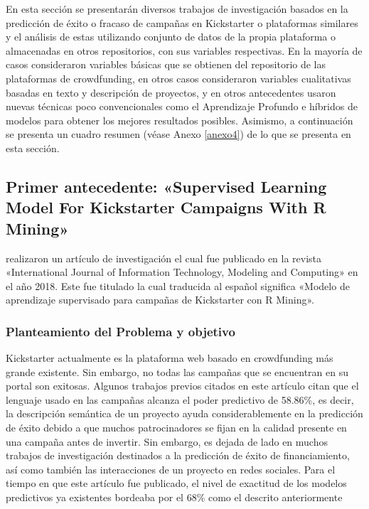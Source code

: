 En esta sección se presentarán diversos trabajos de investigación basados en la predicción de éxito o fracaso de campañas en Kickstarter o plataformas similares y el análisis de estas utilizando conjunto de datos de la propia plataforma o almacenadas en otros repositorios, con sus variables respectivas. En la mayoría de casos consideraron variables básicas que se obtienen del repositorio de las plataformas de crowdfunding, en otros casos consideraron variables cualitativas basadas en texto y descripción de proyectos, y en otros antecedentes usaron nuevas técnicas poco convencionales como el Aprendizaje Profundo e híbridos de modelos para obtener los mejores resultados posibles.
Asimismo, a continuación se presenta un cuadro resumen (véase Anexo \ref{anexo4}) de lo que se presenta en esta sección.

\subsection{Primer antecedente: «Supervised Learning Model For Kickstarter Campaigns With R Mining» \citep*{pr_kamath2018suplearn}}
\citeauthor{pr_kamath2018suplearn} realizaron un artículo de investigación el cual fue publicado en la revista «International Journal of Information Technology, Modeling and Computing» en el año 2018. Este fue titulado  la cual traducida al español significa «Modelo de aprendizaje supervisado para campañas de Kickstarter con R Mining».

\subsubsection{Planteamiento del Problema y objetivo}
Kickstarter actualmente es la plataforma web basado en crowdfunding más grande existente. Sin embargo, no todas las campañas que se encuentran en su portal son exitosas. Algunos trabajos previos citados en este artículo citan que el lenguaje usado en las campañas alcanza el poder predictivo de 58.86\%, es decir, la descripción semántica de un proyecto ayuda considerablemente en la predicción de éxito debido a que muchos patrocinadores se fijan en la calidad presente en una campaña antes de invertir.  Sin embargo, es dejada de lado en muchos trabajos de investigación destinados a la predicción de éxito de financiamiento, así como también las interacciones de un proyecto en redes sociales. Para el tiempo en que este artículo fue publicado, el nivel de exactitud de los modelos predictivos ya existentes bordeaba por el 68\% como el descrito anteriormente

